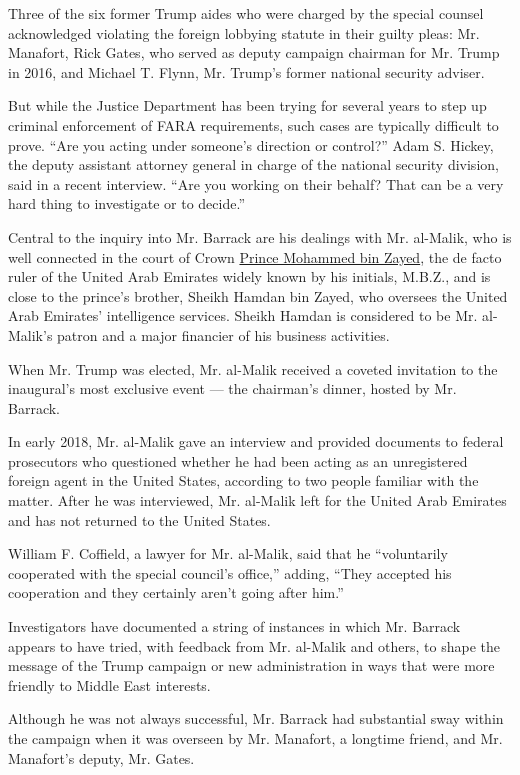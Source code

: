 Three of the six former Trump aides who were charged by the special
counsel acknowledged violating the foreign lobbying statute in their
guilty pleas: Mr. Manafort, Rick Gates, who served as deputy campaign
chairman for Mr. Trump in 2016, and Michael T. Flynn, Mr. Trump's former
national security adviser.

But while the Justice Department has been trying for several years to
step up criminal enforcement of FARA requirements, such cases are
typically difficult to prove. ``Are you acting under someone's direction
or control?'' Adam S. Hickey, the deputy assistant attorney general in
charge of the national security division, said in a recent interview.
``Are you working on their behalf? That can be a very hard thing to
investigate or to decide.''

Central to the inquiry into Mr. Barrack are his dealings with Mr.
al-Malik, who is well connected in the court of Crown
\href{https://www.nytimes.com/2019/06/02/world/middleeast/crown-prince-mohammed-bin-zayed.html}{Prince
Mohammed bin Zayed}, the de facto ruler of the United Arab Emirates
widely known by his initials, M.B.Z., and is close to the prince's
brother, Sheikh Hamdan bin Zayed, who oversees the United Arab Emirates'
intelligence services. Sheikh Hamdan is considered to be Mr. al-Malik's
patron and a major financier of his business activities.

When Mr. Trump was elected, Mr. al-Malik received a coveted invitation
to the inaugural's most exclusive event --- the chairman's dinner,
hosted by Mr. Barrack.

In early 2018, Mr. al-Malik gave an interview and provided documents to
federal prosecutors who questioned whether he had been acting as an
unregistered foreign agent in the United States, according to two people
familiar with the matter. After he was interviewed, Mr. al-Malik left
for the United Arab Emirates and has not returned to the United States.

William F. Coffield, a lawyer for Mr. al-Malik, said that he
``voluntarily cooperated with the special council's office,'' adding,
``They accepted his cooperation and they certainly aren't going after
him.''

Investigators have documented a string of instances in which Mr. Barrack
appears to have tried, with feedback from Mr. al-Malik and others, to
shape the message of the Trump campaign or new administration in ways
that were more friendly to Middle East interests.

Although he was not always successful, Mr. Barrack had substantial sway
within the campaign when it was overseen by Mr. Manafort, a longtime
friend, and Mr. Manafort's deputy, Mr. Gates.

